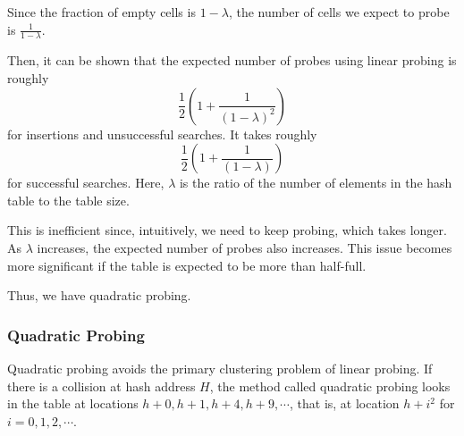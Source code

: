 Since the fraction of empty cells is \(1 - \lambda\), the number of cells we expect to probe is \(\frac{1}{1 - \lambda}\).

Then, it can be shown that the expected number of probes using linear probing is roughly 
\[
\frac{1}{2} \left( 1 + \frac{1}{(1 - \lambda)^2} \right)
\]
for insertions and unsuccessful searches. It takes roughly 
\[
\frac{1}{2} \left( 1 + \frac{1}{(1 - \lambda)} \right)
\]
for successful searches. Here, \(\lambda\) is the ratio of the number of elements in the hash table to the table size.

This is inefficient since, intuitively, we need to keep probing, which takes longer. As \(\lambda\) increases, the expected number of probes also increases. This issue becomes more significant if the table is expected to be more than half-full. 

Thus, we have quadratic probing.

\subsubsection{Quadratic Probing}
Quadratic probing avoids the primary clustering problem of linear probing. If there is a collision at hash address \(H\), the method called quadratic probing looks in the table at locations \(h + 0, h + 1, h + 4, h + 9, \cdots\), that is, at location \(h + i^2\) for \(i = 0, 1, 2, \cdots\).

